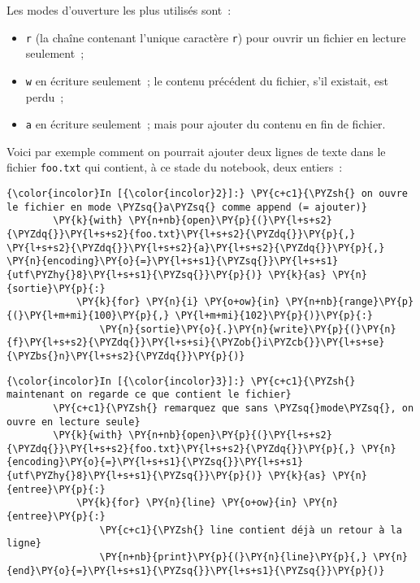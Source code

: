     Les modes d'ouverture les plus utilisés sont~:

\begin{itemize}
\tightlist
\item
  \texttt{\textquotesingle{}r\textquotesingle{}} (la chaîne contenant
  l'unique caractère \texttt{r}) pour ouvrir un fichier en lecture
  seulement~;
\item
  \texttt{\textquotesingle{}w\textquotesingle{}} en écriture seulement~;
  le contenu précédent du fichier, s'il existait, est perdu~;
\item
  \texttt{\textquotesingle{}a\textquotesingle{}} en écriture seulement~;
  mais pour ajouter du contenu en fin de fichier.
\end{itemize}

    Voici par exemple comment on pourrait ajouter deux lignes de texte dans
le fichier \texttt{foo.txt} qui contient, à ce stade du notebook, deux
entiers~:

    \begin{Verbatim}[commandchars=\\\{\}]
{\color{incolor}In [{\color{incolor}2}]:} \PY{c+c1}{\PYZsh{} on ouvre le fichier en mode \PYZsq{}a\PYZsq{} comme append (= ajouter)}
        \PY{k}{with} \PY{n+nb}{open}\PY{p}{(}\PY{l+s+s2}{\PYZdq{}}\PY{l+s+s2}{foo.txt}\PY{l+s+s2}{\PYZdq{}}\PY{p}{,} \PY{l+s+s2}{\PYZdq{}}\PY{l+s+s2}{a}\PY{l+s+s2}{\PYZdq{}}\PY{p}{,} \PY{n}{encoding}\PY{o}{=}\PY{l+s+s1}{\PYZsq{}}\PY{l+s+s1}{utf\PYZhy{}8}\PY{l+s+s1}{\PYZsq{}}\PY{p}{)} \PY{k}{as} \PY{n}{sortie}\PY{p}{:}
            \PY{k}{for} \PY{n}{i} \PY{o+ow}{in} \PY{n+nb}{range}\PY{p}{(}\PY{l+m+mi}{100}\PY{p}{,} \PY{l+m+mi}{102}\PY{p}{)}\PY{p}{:}
                \PY{n}{sortie}\PY{o}{.}\PY{n}{write}\PY{p}{(}\PY{n}{f}\PY{l+s+s2}{\PYZdq{}}\PY{l+s+si}{\PYZob{}i\PYZcb{}}\PY{l+s+se}{\PYZbs{}n}\PY{l+s+s2}{\PYZdq{}}\PY{p}{)}
\end{Verbatim}


    \begin{Verbatim}[commandchars=\\\{\}]
{\color{incolor}In [{\color{incolor}3}]:} \PY{c+c1}{\PYZsh{} maintenant on regarde ce que contient le fichier}
        \PY{c+c1}{\PYZsh{} remarquez que sans \PYZsq{}mode\PYZsq{}, on ouvre en lecture seule}
        \PY{k}{with} \PY{n+nb}{open}\PY{p}{(}\PY{l+s+s2}{\PYZdq{}}\PY{l+s+s2}{foo.txt}\PY{l+s+s2}{\PYZdq{}}\PY{p}{,} \PY{n}{encoding}\PY{o}{=}\PY{l+s+s1}{\PYZsq{}}\PY{l+s+s1}{utf\PYZhy{}8}\PY{l+s+s1}{\PYZsq{}}\PY{p}{)} \PY{k}{as} \PY{n}{entree}\PY{p}{:} 
            \PY{k}{for} \PY{n}{line} \PY{o+ow}{in} \PY{n}{entree}\PY{p}{:}
                \PY{c+c1}{\PYZsh{} line contient déjà un retour à la ligne}
                \PY{n+nb}{print}\PY{p}{(}\PY{n}{line}\PY{p}{,} \PY{n}{end}\PY{o}{=}\PY{l+s+s1}{\PYZsq{}}\PY{l+s+s1}{\PYZsq{}}\PY{p}{)}
\end{Verbatim}


